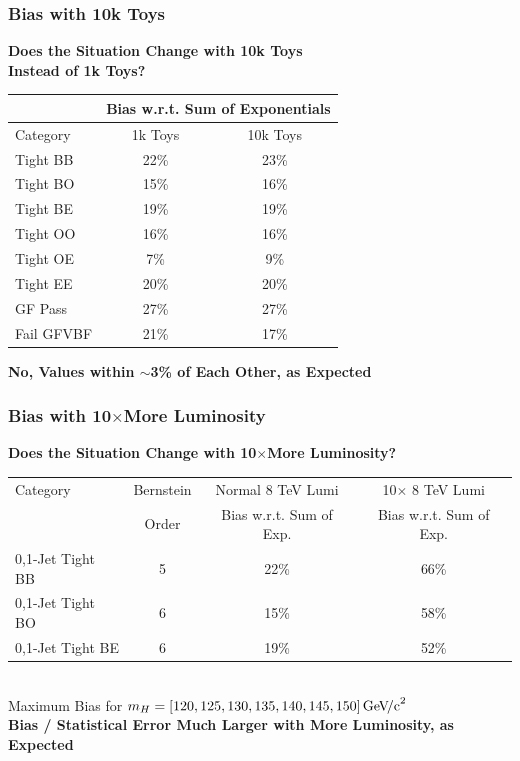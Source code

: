 \documentclass{beamer}
\newcommand{\GeVcc}{\ensuremath{\,\mathrm{Ge\kern -0.1em V\!/c}^2}}
\begin{document}
\begin{frame}
\frametitle{Bias with 10k Toys}
  \begin{center}
  \textbf{Does the Situation Change with 10k Toys \\Instead of 1k Toys?}
  \\\vspace{1em}
    \scriptsize
    \begin{tabular}{|l|c|c|} \hline
 & \multicolumn{2}{c|}{Bias w.r.t. Sum of Exponentials}   \\ \hline 
 Category  & 1k Toys  & 10k Toys   \\ \hline \hline
 Tight BB  &   22\%    &       23\%          \\ \hline         
 Tight BO  &   15\%    &       16\%         \\ \hline        
 Tight BE  &   19\%    &       19\%           \\ \hline        
 Tight OO  &   16\%    &       16\%          \\ \hline        
 Tight OE  &   7\%     &       9\%      \\ \hline           
 Tight EE  &   20\%    &       20\%       \\ \hline         
 GF Pass   &   27\%    &       27\%     \\ \hline         
 Fail GFVBF&   21\%    &       17\%     \\ \hline         
    \end{tabular}
    
  \small
   \vspace{1em}
  \textbf{No, Values within $\sim$3\% of Each Other, as Expected}
  \end{center}
\end{frame}

\begin{frame}
\frametitle{Bias with 10$\times$More Luminosity}
  \begin{center}
  \textbf{Does the Situation Change with 10$\bm{\times}$More Luminosity?}
  \\ \vspace{2em}
    \scriptsize
    \begin{tabular}{|l|c|c|c|} \hline
Category & Bernstein & Normal 8 TeV Lumi & 10$\times$ 8 TeV Lumi \\
         & Order     & Bias w.r.t. Sum of Exp. &  Bias w.r.t. Sum of Exp. \\ \hline \hline
0,1-Jet Tight BB & 5 & 22\% & 66\% \\ \hline
0,1-Jet Tight BO & 6 & 15\%  & 58\% \\ \hline
0,1-Jet Tight BE & 6 & 19\% & 52\% \\ \hline
    \end{tabular}
    \\ Maximum Bias for $m_H=[120,125,130,135,140,145,150]\GeVcc{}$
  \small
  \\ \vspace{1em}
  \textbf{Bias / Statistical Error Much Larger with More Luminosity, as Expected}
  \end{center}
\end{frame}
\end{document}
